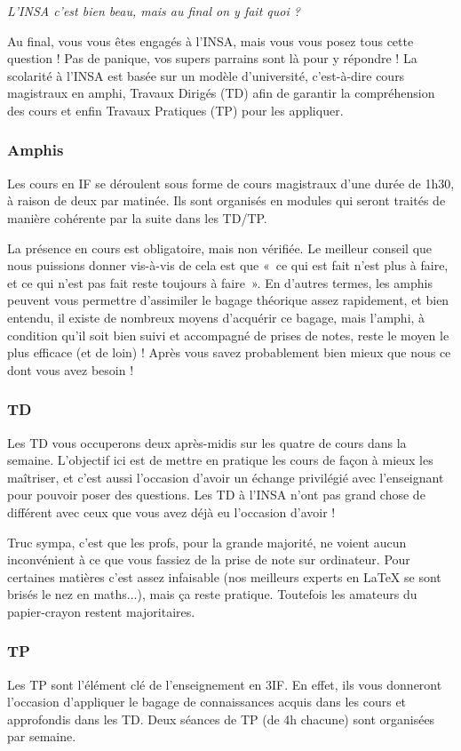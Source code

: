 \begin{citationii}
\emph{L'INSA c'est bien beau, mais au final on y fait quoi ?}
\end{citationii}
Au final, vous vous êtes engagés à l'INSA, mais vous vous posez tous cette
question !
Pas de panique, vos supers parrains sont là pour y répondre !
La scolarité à l'INSA est basée sur un modèle d'université, c'est-à-dire cours
magistraux en amphi, Travaux Dirigés (TD) afin de garantir la compréhension des
cours et enfin Travaux Pratiques (TP) pour les appliquer.

\subsubsection{Amphis}
Les cours en IF se déroulent sous forme de cours magistraux d'une durée de
1h30, à raison de deux par matinée. Ils sont organisés en modules qui
seront traités de manière cohérente par la suite dans les TD/TP.

La présence en cours est obligatoire, mais non vérifiée. Le meilleur conseil que
nous puissions donner vis-à-vis de cela est que «~ce qui est fait n'est plus à
faire, et ce qui n'est pas fait reste toujours à faire~». En d'autres termes, les
amphis peuvent vous permettre d'assimiler le bagage théorique assez rapidement, et bien
entendu, il existe de nombreux moyens d'acquérir ce bagage, mais l'amphi, à
condition qu'il soit bien suivi et accompagné de prises de notes, reste le moyen le plus 
efficace (et de loin) ! Après vous savez probablement bien mieux que nous ce dont vous avez besoin !
\subsubsection{TD}
Les TD vous occuperons deux après-midis sur les quatre de cours dans la semaine.
L'objectif ici est de mettre en pratique les cours de façon à mieux les
maîtriser, et c'est aussi l'occasion d'avoir un échange privilégié avec
l'enseignant pour pouvoir poser des questions. Les TD à l'INSA n'ont pas grand chose
de différent avec ceux que vous avez déjà eu l'occasion d'avoir ! 

Truc sympa, c'est que les profs, pour la grande majorité, ne voient aucun
inconvénient à ce que vous fassiez de la prise de note sur ordinateur. Pour
certaines matières c'est assez infaisable (nos meilleurs experts en \LaTeX{} se
sont brisés le nez en maths...), mais ça reste pratique. Toutefois les
amateurs du papier-crayon restent majoritaires.
\subsubsection{TP}
Les TP sont l'élément clé de l'enseignement en 3IF. En effet, ils
vous donneront l'occasion d'appliquer le bagage de connaissances acquis dans
les cours et approfondis dans les TD. Deux séances de TP (de 4h chacune) sont
organisées par semaine.

